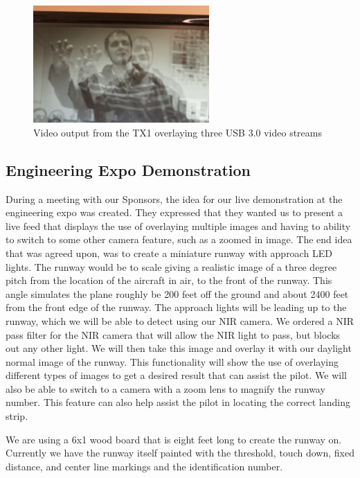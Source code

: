 \documentclass[letterpaper,10pt,titlepage]{IEEEtran}
\begin{document}
\begin{figure}[!ht]
  \caption{Video output from the TX1 overlaying three USB 3.0 video streams}
	  \centering
		    \includegraphics[width=0.6\textwidth]{images/3_normal.png}
				\end{figure}
				
  \subsection{Engineering Expo Demonstration}
  During a meeting with our Sponsors, the idea for our live demonstration at the engineering expo was created. They expressed that they wanted us to present a live feed that displays the use of overlaying multiple images and having to ability to switch to some other camera feature, such as a zoomed in image. The end idea that was agreed upon, was to create a miniature runway with approach LED lights. The runway would be to scale giving a realistic image of a three degree pitch from the location of the aircraft in air, to the front of the runway. This angle simulates the plane roughly be 200 feet off the ground and about 2400 feet from the front edge of the runway. The approach lights will be leading up to the runway, which we will be able to detect using our NIR camera. We ordered a NIR pass filter for the NIR camera that will allow the NIR light to pass, but blocks out any other light. We will then take this image and overlay it with our daylight normal image of the runway. This functionality will show the use of overlaying different types of images to get a desired result that can assist the pilot. We will also be able to switch to a camera with a zoom lens to magnify the runway number. This feature can also help assist the pilot in locating the correct landing strip.\\
  \par
  We are using a 6x1 wood board that is eight feet long to create the runway on. Currently we have the runway itself painted with the threshold, touch down, fixed distance, and center line markings and the identification number.
   
\end{document}
